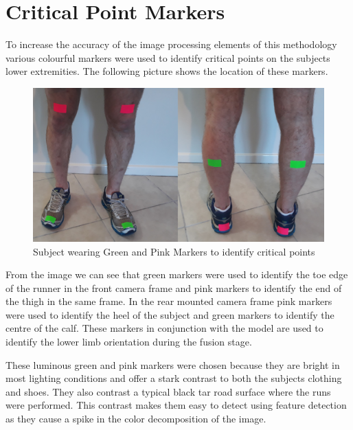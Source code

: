 \section{Critical Point Markers}
To increase the accuracy of the image processing elements of this methodology various colourful markers were used to identify critical points on the subjects lower extremities. The following picture shows the location of these markers.

\begin{figure}[!ht] 
\captionsetup{width=0.8\linewidth, font=small}  
\includegraphics[width=0.7\linewidth]{figures/markers.JPG}
\caption{Subject wearing Green and Pink Markers to identify critical points}
\label{fig:markers}
\end{figure}

From the image we can see that green markers were used to identify  the toe edge of the runner in the front camera frame and pink markers to identify the end of the thigh in the same frame. In the rear mounted camera frame pink markers were used to identify the heel of the subject and green markers to identify the centre of the calf. These markers in conjunction with the model are used to identify the lower limb orientation during the fusion stage.

These luminous green and pink markers were chosen because they are bright in most lighting conditions and offer a stark contrast to both the subjects clothing and shoes. They also contrast a typical black tar road surface where the runs were performed. This contrast makes them easy to detect using feature detection as they  cause a spike in the color decomposition of the image.





